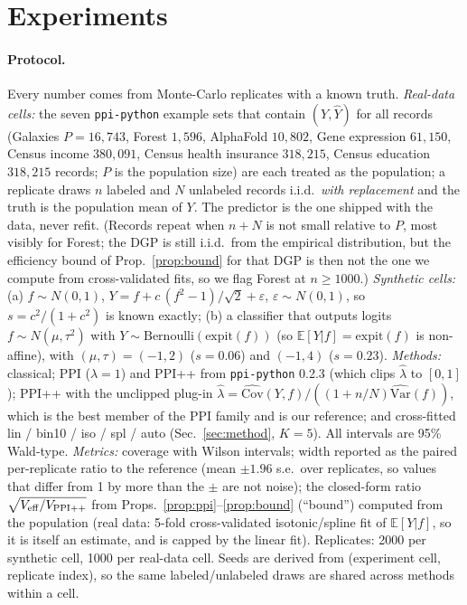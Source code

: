 \section{Experiments}\label{sec:exp}
\paragraph{Protocol.} Every number comes from Monte-Carlo replicates with a known truth. \emph{Real-data cells:} the seven \texttt{ppi-python} example sets that contain $(Y,\hat Y)$ for all records (Galaxies $P{=}16{,}743$, Forest $1{,}596$, AlphaFold $10{,}802$, Gene expression $61{,}150$, Census income $380{,}091$, Census health insurance $318{,}215$, Census education $318{,}215$ records; $P$ is the population size) are each treated as the population; a replicate draws $n$ labeled and $N$ unlabeled records i.i.d.\ \emph{with replacement} and the truth is the population mean of $Y$. The predictor is the one shipped with the data, never refit. (Records repeat when $n+N$ is not small relative to $P$, most visibly for Forest; the DGP is still i.i.d.\ from the empirical distribution, but the efficiency bound of Prop.~\ref{prop:bound} for that DGP is then not the one we compute from cross-validated fits, so we flag Forest at $n\ge1000$.) \emph{Synthetic cells:} (a) $f\sim N(0,1)$, $Y=f+c\,(f^2-1)/\sqrt2+\varepsilon$, $\varepsilon\sim N(0,1)$, so $s=c^2/(1+c^2)$ is known exactly; (b) a classifier that outputs logits $f\sim N(\mu,\tau^2)$ with $Y\sim\mathrm{Bernoulli}(\mathrm{expit}(f))$ (so $\mathbb E[Y|f]=\mathrm{expit}(f)$ is non-affine), with $(\mu,\tau)=(-1,2)$ ($s=0.06$) and $(-1,4)$ ($s=0.23$). \emph{Methods:} classical; PPI ($\lambda{=}1$) and PPI++ from \texttt{ppi-python} 0.2.3 (which clips $\hat\lambda$ to $[0,1]$); PPI++ with the unclipped plug-in $\hat\lambda=\widehat{\mathrm{Cov}}(Y,f)/((1+n/N)\widehat{\mathrm{Var}}(f))$, which is the best member of the PPI family and is our reference; and cross-fitted lin / bin10 / iso / spl / auto (Sec.~\ref{sec:method}, $K=5$). All intervals are 95\% Wald-type. \emph{Metrics:} coverage with Wilson intervals; width reported as the paired per-replicate ratio to the reference (mean $\pm1.96$ s.e.\ over replicates, so values that differ from 1 by more than the $\pm$ are not noise); the closed-form ratio $\sqrt{V_{\rm eff}/V_{\rm PPI++}}$ from Props.~\ref{prop:ppi}--\ref{prop:bound} (``bound'') computed from the population (real data: 5-fold cross-validated isotonic/spline fit of $\mathbb E[Y|f]$, so it is itself an estimate, and is capped by the linear fit). Replicates: 2000 per synthetic cell, 1000 per real-data cell. Seeds are derived from (experiment cell, replicate index), so the same labeled/unlabeled draws are shared across methods within a cell.

